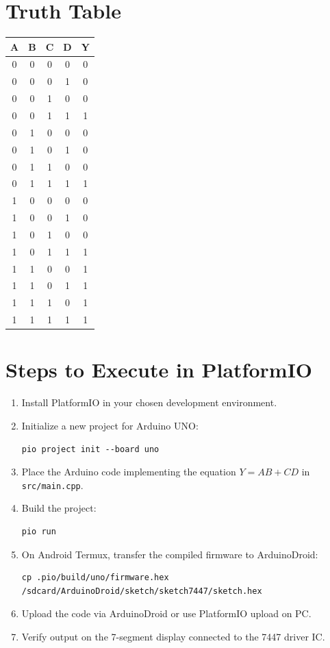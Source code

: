 \documentclass[12pt]{article}
\begin{document}
\section*{Truth Table}
\begin{center}
\begin{tabular}{|c|c|c|c|c|}
\hline
A & B & C & D & Y \\
\hline
0 & 0 & 0 & 0 & 0 \\
0 & 0 & 0 & 1 & 0 \\
0 & 0 & 1 & 0 & 0 \\
0 & 0 & 1 & 1 & 1 \\
0 & 1 & 0 & 0 & 0 \\
0 & 1 & 0 & 1 & 0 \\
0 & 1 & 1 & 0 & 0 \\
0 & 1 & 1 & 1 & 1 \\
1 & 0 & 0 & 0 & 0 \\
1 & 0 & 0 & 1 & 0 \\
1 & 0 & 1 & 0 & 0 \\
1 & 0 & 1 & 1 & 1 \\
1 & 1 & 0 & 0 & 1 \\
1 & 1 & 0 & 1 & 1 \\
1 & 1 & 1 & 0 & 1 \\
1 & 1 & 1 & 1 & 1 \\
\hline
\end{tabular}
\end{center}

\section*{Steps to Execute in PlatformIO}
\begin{enumerate}
    \item Install PlatformIO in your chosen development environment.
    \item Initialize a new project for Arduino UNO:
        \begin{verbatim}
pio project init --board uno
        \end{verbatim}
    \item Place the Arduino code implementing the equation \(Y = AB + CD\) in \texttt{src/main.cpp}.
    \item Build the project:
        \begin{verbatim}
pio run
        \end{verbatim}
    \item On Android Termux, transfer the compiled firmware to ArduinoDroid:
        \begin{verbatim}
cp .pio/build/uno/firmware.hex /sdcard/ArduinoDroid/sketch/sketch7447/sketch.hex
        \end{verbatim}
    \item Upload the code via ArduinoDroid or use PlatformIO upload on PC.
    \item Verify output on the 7-segment display connected to the 7447 driver IC.
\end{enumerate}
\end{document}
